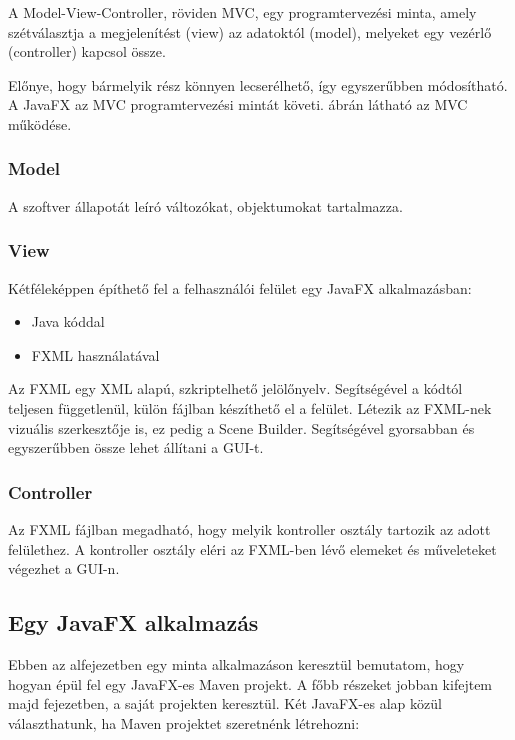 A Model-View-Controller, röviden MVC, egy programtervezési minta, amely szétválasztja a megjelenítést (view) az adatoktól (model), melyeket egy vezérlő (controller) kapcsol össze. 

Előnye, hogy bármelyik rész könnyen lecserélhető, így egyszerűbben módosítható.
A JavaFX az MVC programtervezési mintát követi.
 ábrán látható az MVC működése.



\subsubsection*{Model} 

A szoftver állapotát leíró változókat, objektumokat tartalmazza. 

\subsubsection*{View}

Kétféleképpen építhető fel a felhasználói felület egy JavaFX alkalmazásban: 

\begin{itemize}
\setlength\itemsep{0em}
\item Java kóddal 
\item FXML használatával 
\end{itemize}

Az FXML egy XML alapú, szkriptelhető jelölőnyelv.
Segítségével a kódtól teljesen függetlenül, külön fájlban készíthető el a felület.
Létezik az FXML-nek vizuális szerkesztője is, ez pedig a Scene Builder.
Segítségével gyorsabban és egyszerűbben össze lehet állítani a GUI-t. \cite{javafx}

\subsubsection*{Controller}

Az FXML fájlban megadható, hogy melyik kontroller osztály tartozik az adott felülethez.
A kontroller osztály eléri az FXML-ben lévő elemeket és műveleteket végezhet a GUI-n.


\subsection{Egy JavaFX alkalmazás}\label{javafxMinta}

Ebben az alfejezetben egy minta alkalmazáson keresztül bemutatom, hogy hogyan épül fel egy JavaFX-es Maven projekt.
A főbb részeket jobban kifejtem majd  fejezetben, a saját projekten keresztül.
Két JavaFX-es alap közül választhatunk, ha Maven projektet szeretnénk létrehozni: 

